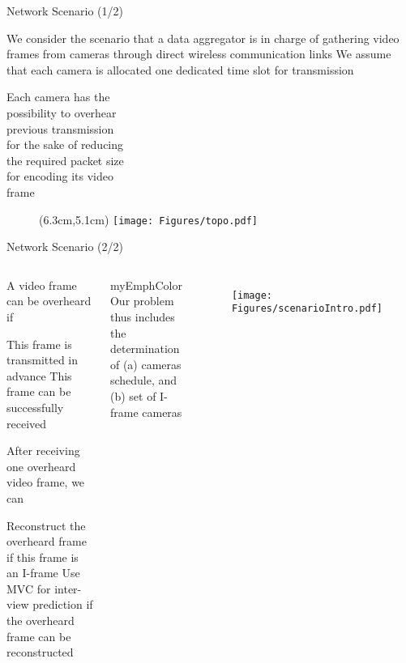 \begin{frame}{Network Scenario (1/2)}
\begin{itemize}
	\myItem We consider the scenario that a data aggregator is in charge of gathering video frames from cameras through direct wireless communication links
	\myItem We assume that each camera is allocated one dedicated time slot for transmission
	\begin{itemize}
		\mySubItem Each camera has the \\
				   possibility to overhear \\
				   previous transmission \\
				   for the sake of reducing \\
				   the required packet size \\
				   for encoding its video \\
				   frame
	\end{itemize}
\end{itemize}
%
\begin{figure}
\centering
\begin{textblock*}{1cm}(6.3cm,5.1cm) %
\texttt{[image: Figures/topo.pdf]}
\end{textblock*}
\end{figure}
%
\end{frame}
\begin{frame}{Network Scenario (2/2)}
\begin{columns}
	\column{0.7\textwidth}
	\begin{itemize}
		\myItem A video frame can be overheard if
		\begin{itemize}
			\mySubItem This frame is transmitted in advance
			\mySubItem This frame can be successfully received
		\end{itemize}
		\myItem After receiving one overheard video frame, we can
		\begin{itemize}
			\mySubItem Reconstruct the overheard frame if this frame is an I-frame
			\mySubItem Use MVC for inter-view prediction if the overheard frame can be reconstructed
		\end{itemize}
	\end{itemize}
	\begin{beamercolorbox}[center,shadow=true,rounded=true]{myEmphColor}
	Our problem thus includes the determination of (a) cameras schedule, and \\ (b) set of I-frame cameras
	\end{beamercolorbox}
 
	\begin{figure}
	\centering
	\texttt{[image: Figures/scenarioIntro.pdf]}
	\end{figure}
\end{columns}
\end{frame}